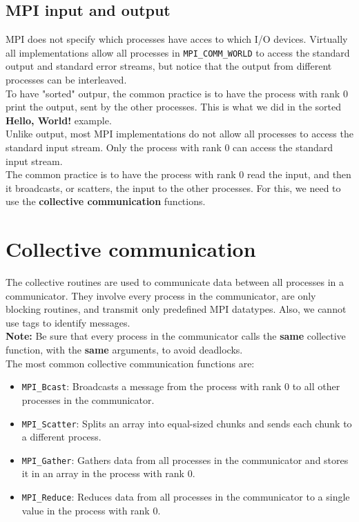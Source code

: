 \subsection{MPI input and output}

MPI does not specify which processes have acces to which I/O devices. Virtually all
implementations allow all processes in \texttt{MPI\_COMM\_WORLD} to access the standard 
output and standard error streams, but notice that the output from different processes
can be interleaved.\\

To have "sorted" outpur, the common practice is to have the process with rank 0 print
the output, sent by the other processes. This is what we did in the sorted \textbf{Hello, World!}
example.\\

Unlike output, most MPI implementations do not allow all processes to access the standard
input stream. Only the process with rank 0 can access the standard input stream.\\

The common practice is to have the process with rank 0 read the input, and then it broadcasts,
or scatters, the input to the other processes. For this, we need to use the \textbf{collective
communication} functions.

\section{Collective communication}

The collective routines are used to communicate data between all processes in a communicator.
They involve every process in the communicator, are only blocking routines, and transmit only
predefined MPI datatypes. Also, we cannot use tags to identify messages.\\

\textbf{Note:} Be sure that every process in the communicator calls the \textbf{same}
collective function, with the \textbf{same} arguments, to avoid deadlocks.\\

The most common collective communication functions are:
\begin{itemize}
    \item \texttt{MPI\_Bcast}: Broadcasts a message from the process with rank 0 to all other
    processes in the communicator.
    \item \texttt{MPI\_Scatter}: Splits an array into equal-sized chunks and sends each chunk
    to a different process.
    \item \texttt{MPI\_Gather}: Gathers data from all processes in the communicator and stores
    it in an array in the process with rank 0.
    \item \texttt{MPI\_Reduce}: Reduces data from all processes in the communicator to a single
    value in the process with rank 0.
\end{itemize}

